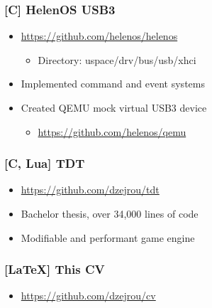 \documentclass[8pt]{article}
\def\cpp{{C\nolinebreak[4]\hspace{-.05em}\raisebox{.4ex}{\tiny\bf ++\xspace}}}
\begin{document}
\begin{minipage}[t]{0.45\textwidth}
    \centering

    \subsubsection*{[C] HelenOS USB3}
    \begin{itemize}
        \item \url{https://github.com/helenos/helenos}
        \begin{itemize}
            \item Directory: uspace/drv/bus/usb/xhci
        \end{itemize}
        \item Implemented command and event systems
        \item Created QEMU mock virtual USB3 device
        \begin{itemize}
            \item \url{https://github.com/helenos/qemu}
        \end{itemize}
    \end{itemize}

    \subsubsection*{[\cpp, Lua] TDT}
    \begin{itemize}
        \item \url{https://github.com/dzejrou/tdt}
        \item Bachelor thesis, over 34,000 lines of code
        \item Modifiable and performant game engine
    \end{itemize}

    \subsubsection*{[\LaTeX] This CV}
    \begin{itemize}
        \item \url{https://github.com/dzejrou/cv}
    \end{itemize}
\end{minipage}
\end{document}
